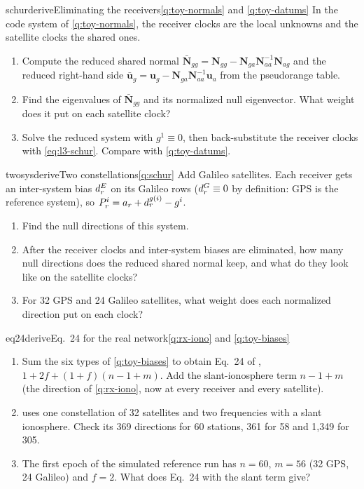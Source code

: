 \begin{question}{schur}{derive}{Eliminating the receivers}{\ref{q:toy-normals} and \ref{q:toy-datums}}
In the code system of \cref{q:toy-normals}, the receiver clocks are the local
unknowns and the satellite clocks the shared ones.
\begin{enumerate}[leftmargin=*, itemsep=1pt]
\item Compute the reduced shared normal
      $\bar{\bm{N}}_{gg} = \bm{N}_{gg} - \bm{N}_{ga}\bm{N}_{aa}^{-1}\bm{N}_{ag}$ and
      the reduced right-hand side
      $\bar{\bm{u}}_g = \bm{u}_g - \bm{N}_{ga}\bm{N}_{aa}^{-1}\bm{u}_a$ from the
      pseudorange table.
\item Find the eigenvalues of $\bar{\bm{N}}_{gg}$ and its normalized null
      eigenvector. What weight does it put on each satellite clock?
\item Solve the reduced system with $g^1 \equiv 0$, then back-substitute the
      receiver clocks with \cref{eq:l3-schur}. Compare with \cref{q:toy-datums}.
\end{enumerate}
\end{question}

\begin{question}{twosys}{derive}{Two constellations}{\ref{q:schur}}
Add Galileo satellites. Each receiver gets an inter-system bias $d^{E}_r$ on its
Galileo rows ($d^{G}_r \equiv 0$ by definition: GPS is the reference system), so
$P^i_r = a_r + d^{g(i)}_r - g^i$.
\begin{enumerate}[leftmargin=*, itemsep=1pt]
\item Find the null directions of this system.
\item After the receiver clocks and inter-system biases are eliminated, how many
      null directions does the reduced shared normal keep, and what do they look
      like on the satellite clocks?
\item For 32 GPS and 24 Galileo satellites, what weight does each normalized
      direction put on each clock?
\end{enumerate}
\end{question}

\begin{question}{eq24}{derive}{Eq.~24 for the real network}{\ref{q:rx-iono} and \ref{q:toy-biases}}
\begin{enumerate}[leftmargin=*, itemsep=1pt]
\item Sum the six types of \cref{q:toy-biases} to obtain Eq.~24 of
      \cite{odijk2016estimability}, $1 + 2f + (1+f)(n-1+m)$. Add the
      slant-ionosphere term $n - 1 + m$ (the direction of \cref{q:rx-iono}, now at
      every receiver and every satellite).
\item {} uses one constellation of 32 satellites and two
      frequencies with a slant ionosphere. Check its 369 directions for 60
      stations, 361 for 58 and 1,349 for 305.
\item The first epoch of the simulated reference run has $n = 60$, $m = 56$ (32
      GPS, 24 Galileo) and $f = 2$. What does Eq.~24 with the slant term give?
\end{enumerate}
\end{question}

